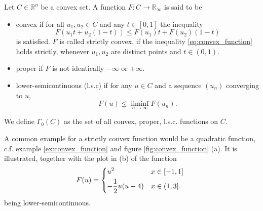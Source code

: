     \begin{definition} %
    \label{def:convex_function_proper_lower_semicontinuous}

        Let $C \in \mathbb{R}^{n}$ be a convex set. A function $F: C \longrightarrow \mathbb{R}_{\infty}$ is said to be
            \begin{itemize}
                \item convex if for all $u_{1}, u_{2} \in C$ and any $t \in [0, 1]$ the inequality
                \begin{equation}
                    F(u_{1}t + u_{2}(1 - t)) \le F(u_{1})t + F(u_{2})(1 - t)
                    \label{eq:convex_function}
                \end{equation}
                is satisfied. $F$ is called strictly convex, if the inequality \ref{eq:convex_function} holds strictly, whenever $u_{1}, u_{2}$ are distinct points and $t \in (0, 1)$.
                \item proper if $F$ is not identically $-\infty$ or $+\infty$.
                \item lower-semicontinuous (l.s.c) if for any $u \in C$ and a sequence $(u_{n})$ converging to $u$,
                    \begin{equation}
                        F(u) \le \liminf_{n \rightarrow \infty} F(u_{n}).
                        \label{eq:lower_semicontinuous}
                    \end{equation}
            \end{itemize}
        We define $\Gamma_{0}(C)$ as the set of all convex, proper, l.s.c. functions on $C$.

    \end{definition}

    A common example for a strictly convex function would be a quadratic function, c.f. example \ref{ex:convex_function} and figure \ref{fig:convex_function} (a). It is illustrated, together with the plot in (b) of the function
        \begin{equation}
            F(u) =
                \begin{dcases*}
                    u^{2} & \textnormal{$x \in [-1, 1]$} \\
                    - \frac{1}{2} u(u - 4) & \textnormal{$x \in (1, 3]$}.
                \end{dcases*}
            \label{eq:lsc_example}
        \end{equation}
    being lower-semicontinuous.

